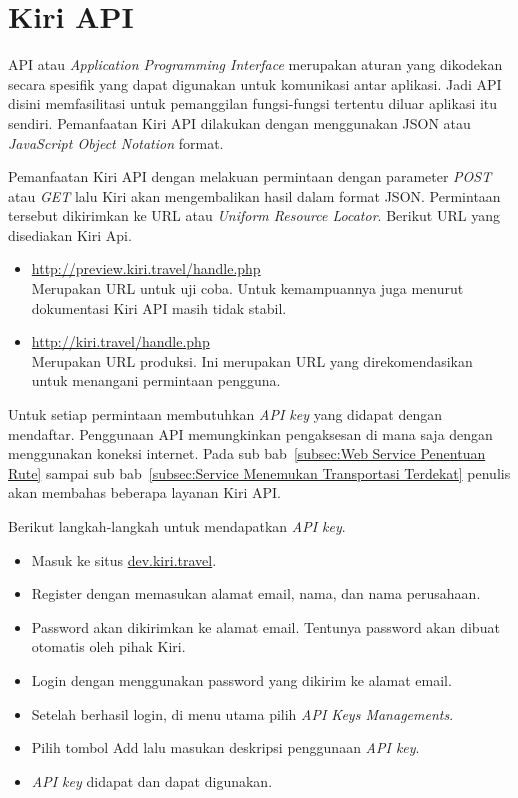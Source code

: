 \section{Kiri API}
\label{sec:Kiri API}
\hspace{0.5cm} API atau \textit{Application Programming Interface} merupakan aturan yang dikodekan secara spesifik yang dapat digunakan untuk komunikasi antar aplikasi. Jadi API disini memfasilitasi untuk pemanggilan fungsi-fungsi tertentu diluar aplikasi itu sendiri. Pemanfaatan Kiri API dilakukan dengan menggunakan JSON atau \textit{JavaScript Object Notation} format. 

Pemanfaatan Kiri API dengan melakuan permintaan dengan parameter \textit{POST} atau \textit{GET} lalu Kiri akan mengembalikan hasil dalam format JSON. Permintaan tersebut dikirimkan ke URL atau \textit{Uniform Resource Locator}. Berikut URL yang disediakan Kiri Api.
\begin{itemize}
	\item \url{http://preview.kiri.travel/handle.php} \\
	Merupakan URL untuk uji coba. Untuk kemampuannya juga menurut dokumentasi Kiri API masih tidak stabil.
	\item \url{http://kiri.travel/handle.php} \\
	Merupakan URL produksi. Ini merupakan URL yang direkomendasikan untuk menangani permintaan pengguna.
\end{itemize}
Untuk setiap permintaan membutuhkan \textit{API key} yang didapat dengan mendaftar\cite{Kiri}. Penggunaan API memungkinkan pengaksesan di mana saja dengan menggunakan koneksi internet. Pada sub bab~\ref{subsec:Web Service Penentuan Rute} sampai sub bab~\ref{subsec:Service Menemukan Transportasi Terdekat} penulis akan membahas beberapa layanan Kiri API.

Berikut langkah-langkah untuk mendapatkan \textit{API key}.
\begin{itemize}
	\item Masuk ke situs \url{dev.kiri.travel}.
	\item Register dengan memasukan alamat email, nama, dan nama perusahaan.
	\item Password akan dikirimkan ke alamat email. Tentunya password akan dibuat otomatis oleh pihak Kiri.
	\item Login dengan menggunakan password yang dikirim ke alamat email. 
	\item Setelah berhasil login, di menu utama pilih \textit{API Keys Managements}.
	\item Pilih tombol Add lalu masukan deskripsi penggunaan \textit{API key}.
	\item \textit{API key} didapat dan dapat digunakan.
\end{itemize}

